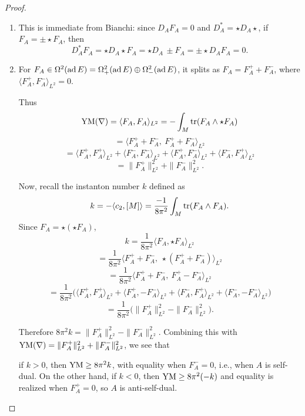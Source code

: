 \documentclass[main]{subfiles}
\begin{document}
\begin{proof}
\begin{enumerate}
	\item This is immediate from Bianchi: since $D_AF_A=0$ and $D_A^\ast = \star D_A\star$, if $F_A = \pm\star F_A$, then
	\[
	D_A^\ast F_A = \star D_A\star F_A = \star D_A\,{\pm} F_A = \pm\star D_AF_A = 0.
	\]
	\item For $F_A\in\Omega^2(\operatorname{ad} E) = \Omega_+^2(\operatorname{ad} E)\oplus\Omega_-^2(\operatorname{ad} E)$, it splits as $F_A = F_A^+ + F_A^-$, where $\langle F_A^+,F_A^-\rangle_{L^2}=0$.

	Thus
	\[
	\operatorname{YM}(\nabla) = \langle F_A,F_A\rangle_{L^2} = -\int_M \operatorname{tr}(F_A\wedge\star F_A)
	\]
	\[
	= \langle F_A^++F_A^-,\ F_A^++F_A^-\rangle_{L^2}
	\]
	\[
	= \langle F_A^+,F_A^+\rangle_{L^2} + \langle F_A^-,F_A^-\rangle_{L^2} + \langle F_A^+,F_A^-\rangle_{L^2} + \langle F_A^-,F_A^+\rangle_{L^2}
	\]
	\[
	= \|F_A^+\|_{L^2}^2 + \|F_A^-\|_{L^2}^2.
	\]

	Now, recall the instanton number $k$ defined as
	\[
	k = -\langle c_2,[M]\rangle = \frac{-1}{8\pi^2}\int_M \operatorname{tr}(F_A\wedge F_A).
	\]
	Since $F_A = \star(\star F_A)$,
	\[
	k = \frac{1}{8\pi^2}\langle F_A,\star F_A\rangle_{L^2}
	\]
	\[
	= \frac{1}{8\pi^2}\langle F_A^++F_A^-,\ \star(F_A^++F_A^-)\rangle_{L^2}
	\]
	\[
	= \frac{1}{8\pi^2}\langle F_A^++F_A^-,\ F_A^+-F_A^-\rangle_{L^2}
	\]
	\[
	= \frac{1}{8\pi^2}\Big(\langle F_A^+,F_A^+\rangle_{L^2} + \langle F_A^+,-F_A^-\rangle_{L^2} + \langle F_A^-,F_A^+\rangle_{L^2} + \langle F_A^-,-F_A^-\rangle_{L^2}\Big)
	\]
	\[
	= \frac{1}{8\pi^2}\Big(\|F_A^+\|_{L^2}^2 - \|F_A^-\|_{L^2}^2\Big).
	\]

	Therefore $8\pi^2 k = \|F_A^+\|_{L^2}^2 - \|F_A^-\|_{L^2}^2$. Combining this with $\operatorname{YM}(\nabla) = \|F_A^+\|_{L^2}^2+\|F_A^-\|_{L^2}^2$, we see that

	if $k>0$, then $\operatorname{YM}\geq 8\pi^2 k$, with equality when $F_A^-=0$, i.e., when $A$ is self-dual. On the other hand, if $k<0$, then $\operatorname{YM}\geq 8\pi^2(-k)$ and equality is realized when $F_A^+=0$, so $A$ is anti-self-dual. \qedhere
\end{enumerate}
\end{proof}
\end{document}
